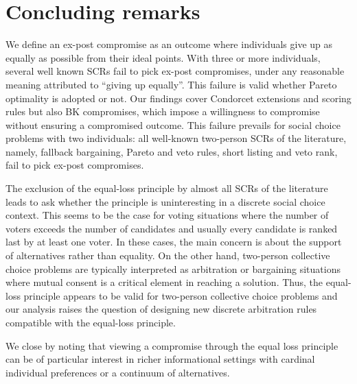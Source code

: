 


\section{Concluding remarks}

We define an ex-post compromise as an outcome where individuals give up as equally as possible from their ideal points. With three or more individuals, several well known \acp{SCR} fail to pick ex-post compromises, under any reasonable meaning attributed to “giving up equally”. This failure is valid whether Pareto optimality is adopted or not. Our findings cover Condorcet extensions and scoring rules but also BK compromises, which impose a willingness to compromise without ensuring a compromised outcome. This failure prevails for social choice problems with two individuals: all well-known two-person \acp{SCR} of the literature, namely, fallback bargaining, Pareto and veto rules, short listing and veto rank, fail to pick ex-post compromises.

The exclusion of the equal-loss principle by almost all \acp{SCR} of the literature leads to ask whether the principle is uninteresting in a discrete social choice context. This seems to be the case for voting situations where the number of voters exceeds the number of candidates and usually every candidate is ranked last by at least one voter. In these cases, the main concern is about the support of alternatives rather than equality. On the other hand, two-person collective choice problems are typically interpreted as arbitration or bargaining situations where mutual consent is a critical element in reaching a solution. Thus, the equal-loss principle appears to be valid for two-person collective choice problems and our analysis raises the question of designing new discrete arbitration rules compatible with the equal-loss principle. 

We close by noting that viewing a compromise through the equal loss principle can be of particular interest in richer informational settings with cardinal individual preferences or a continuum of alternatives.
